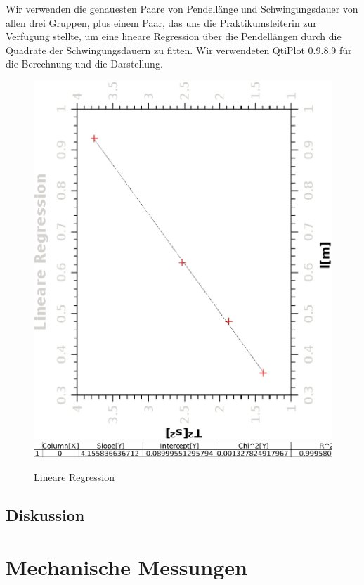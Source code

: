 \documentclass{article}
\begin{document}
Wir verwenden die genauesten Paare von Pendellänge und Schwingungsdauer von allen drei Gruppen, plus einem Paar, das uns die Praktikumsleiterin zur Verfügung stellte, um eine lineare Regression über die Pendellängen durch die Quadrate der Schwingungsdauern zu fitten. Wir verwendeten QtiPlot 0.9.8.9 für die Berechnung und die Darstellung. \\
\begin{figure}


\centering
\includegraphics[scale=0.8,angle=-90]{LinearReg.eps} \\
\includegraphics[scale=0.5,angle=0]{regressiondata.eps}
\caption{Lineare Regression}

\end{figure}
\subsection{Diskussion}
\section{Mechanische Messungen}
\end{document}
